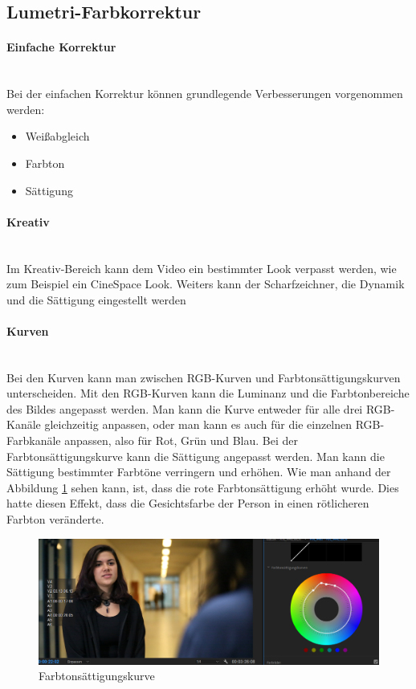 \subsection{Lumetri-Farbkorrektur}
\paragraph{Einfache Korrektur}
\leavevmode \\
Bei der einfachen Korrektur können grundlegende Verbesserungen vorgenommen werden:\citep{farbkorrektur}
\begin{itemize}
	\item Weißabgleich
	\item Farbton
	\item Sättigung
\end{itemize}
\paragraph{Kreativ}
\leavevmode \\
Im Kreativ-Bereich kann dem Video ein bestimmter Look verpasst werden, wie zum Beispiel ein CineSpace Look. Weiters kann der Scharfzeichner, die Dynamik und die Sättigung eingestellt werden\citep{farbkorrektur}
\paragraph{Kurven}
\leavevmode \\
Bei den Kurven kann man zwischen RGB-Kurven und Farbtonsättigungskurven unterscheiden.\newline
Mit den RGB-Kurven kann die Luminanz und die Farbtonbereiche des Bildes angepasst werden. Man kann die Kurve entweder für alle drei RGB-Kanäle gleichzeitig anpassen, oder man kann es auch für die einzelnen RGB-Farbkanäle anpassen, also für Rot, Grün und Blau.\newline
Bei der Farbtonsättigungskurve kann die Sättigung angepasst werden. Man kann die Sättigung bestimmter Farbtöne verringern und erhöhen.\citep{farbkorrektur}\newline
Wie man anhand der Abbildung \ref{fig:abb19} sehen kann, ist, dass die rote Farbtonsättigung erhöht wurde. Dies hatte diesen Effekt, dass die Gesichtsfarbe der Person in einen rötlicheren Farbton veränderte.
\begin{figure}[H]
	\centering
	\includegraphics[width=1.0\textwidth]{abb19} 
	\caption{Farbtonsättigungskurve}\label{fig:abb19}
\end{figure}
